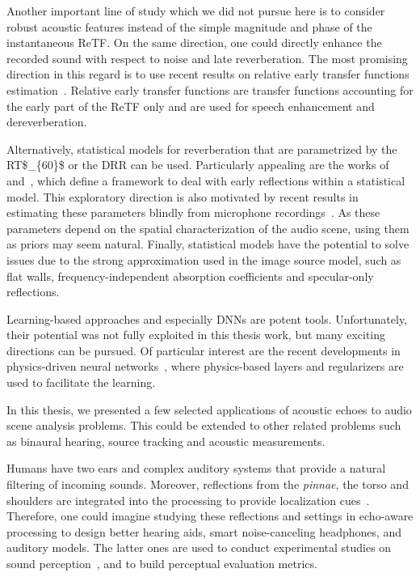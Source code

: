 \mynewline
Another important line of study which we did not pursue here is to consider robust acoustic features instead of the simple magnitude and phase of the instantaneous \ac{ReTF}.
On the same direction, one could directly enhance the recorded sound with respect to noise and late reverberation.
The most promising direction in this regard is to use recent results on relative early transfer functions estimation~.
Relative early transfer functions are transfer functions accounting for the early part of the \ac{ReTF} only and are used for speech enhancement and dereverberation.

\mynewline
Alternatively, statistical models for reverberation that are parametrized by the \ac{RT$_{60}$} or the \acf{DRR} can be used.
Particularly appealing are the works of~ and~, which define a framework to deal with early reflections within a statistical model.
This exploratory direction is also motivated by recent results in estimating these parameters blindly from microphone recordings~.
As these parameters depend on the spatial characterization of the audio scene, using them as priors may seem natural.
Finally, statistical models have the potential to solve issues due to the strong approximation used in the image source model, such as flat walls, frequency-independent absorption coefficients and specular-only reflections.

\mynewline
Learning-based approaches and especially \acfp{DNN} are potent tools.
Unfortunately, their potential was not fully exploited in this thesis work, but many exciting directions can be pursued.
Of particular interest are the recent developments in physics-driven neural networks~,
where physics-based layers and regularizers are used to facilitate the learning.

In this thesis, we presented a few selected applications of acoustic echoes to audio scene analysis problems.
This could be extended to other related problems such as binaural hearing, source tracking and acoustic measurements.

\mynewline
Humans have two ears and complex auditory systems that provide a natural filtering of incoming sounds.
Moreover, reflections from the \textit{pinnae}, the torso and shoulders are integrated into the processing to provide localization cues~.
Therefore, one could imagine studying these reflections and settings in echo-aware processing to design better hearing aids, smart noise-canceling headphones, and auditory models.
The latter ones are used to conduct experimental studies on sound perception~, and to build perceptual evaluation metrics.

